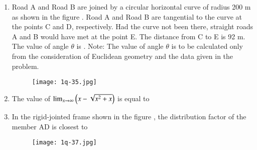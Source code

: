 \documentclass[journal,12pt,onecolumn]{article}
\theoremstyle{remark}
\begin{document}
\begin{enumerate}
\hfill{}

\item Road A and Road B are joined by a circular horizontal curve of radius 200 m as shown in the figure . Road A and Road B are tangential to the curve at the points C and D, respectively. Had the curve not been there, straight roads A and B would have met at the point E. The distance from C to E is 92 m. The value of angle $\theta$  is \underline{\hspace{2cm}} .
Note: The value of angle $\theta$ is to be calculated only from the consideration of Euclidean geometry and the data given in the problem.
\begin{figure}[H]
    \centering
    \texttt{[image: 1q-35.jpg]}
    \caption{}
    \label{fig:q35}
\end{figure}

\hfill{}

\item The value of $\lim_{x \to \infty} \left(x - \sqrt{x^2+x}\right)$ is equal to

\hfill{}
\begin{enumerate}
\end{enumerate}

\item In the rigid-jointed frame shown in the figure , the distribution factor of the member AD is closest to
\begin{figure}[H]
    \centering
    \texttt{[image: 1q-37.jpg]}
    \caption{}
    \label{fig:q37}
\end{figure}

\hfill{}
\begin{enumerate}
\end{enumerate}


\end{enumerate}
\end{document}
